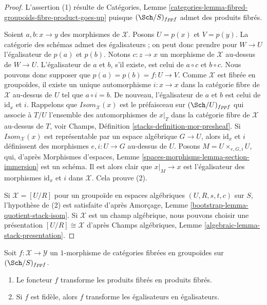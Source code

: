 \begin{proof}
L'assertion (1) résulte de
Catégories, Lemme \ref{categories-lemma-fibred-groupoids-fibre-product-goes-up}
puisque $(\Sch/S)_{fppf}$ admet des produits fibrés.

\medskip\noindent
Soient $a, b : x \to y$ des morphismes de $\mathcal{X}$.
Posons $U = p(x)$ et $V = p(y)$. La catégorie des schémas admet des égalisateurs ;
on peut donc prendre pour $W \to U$ l'égalisateur de $p(a)$ et $p(b)$.
Notons $c : z \to x$ un morphisme de $\mathcal{X}$ au-dessus de $W \to U$.
L'égalisateur de $a$ et $b$, s'il existe, est celui de $a \circ c$
et $b \circ c$. Nous pouvons donc supposer que $p(a) = p(b) = f : U \to V$.
Comme $\mathcal{X}$ est fibrée en groupoïdes, il existe un unique automorphisme
$i : x \to x$ dans la catégorie fibre de $\mathcal{X}$ au-dessus de $U$ tel que
$a \circ i = b$. De nouveau, l'égalisateur de $a$ et $b$ est celui de
$\text{id}_x$ et $i$. Rappelons que $\mathit{Isom}_\mathcal{X}(x)$
est le préfaisceau sur $(\Sch/U)_{fppf}$ qui associe à
$T/U$ l'ensemble des automorphismes de $x|_T$ dans la catégorie fibre
de $\mathcal{X}$ au-dessus de $T$, voir
Champs, Définition \ref{stacks-definition-mor-presheaf}.
Si $\mathit{Isom}_\mathcal{X}(x)$ est représentable par un espace algébrique
$G \to U$, alors $\text{id}_x$ et $i$ définissent des morphismes
$e, i : U \to G$ au-dessus de $U$. Posons $M = U \times_{e, G, i} U$, qui, d'après
Morphismes d'espaces, Lemme \ref{spaces-morphisms-lemma-section-immersion}
est un schéma. Il est alors clair que $x|_M \to x$ est l'égalisateur des
morphismes $\text{id}_x$ et $i$ dans $\mathcal{X}$.
Cela prouve (2).

\medskip\noindent
Si $\mathcal{X} = [U/R]$ pour un groupoïde en espaces algébriques
$(U, R, s, t, c)$ sur $S$, l'hypothèse de (2) est satisfaite d'après
Amorçage, Lemme \ref{bootstrap-lemma-quotient-stack-isom}.
Si $\mathcal{X}$ est un champ algébrique, nous pouvons choisir une
présentation $[U/R] \cong \mathcal{X}$ d'après
Champs algébriques, Lemme \ref{algebraic-lemma-stack-presentation}.
\end{proof}

\begin{lemma}
\label{lemma-fibre-products-morphism}
Soit $f : \mathcal{X} \to \mathcal{Y}$ un $1$-morphisme de catégories
fibrées en groupoïdes sur $(\Sch/S)_{fppf}$.
\begin{enumerate}
\item Le foncteur $f$ transforme les produits fibrés en produits fibrés.
\item Si $f$ est fidèle, alors $f$ transforme les égalisateurs en égalisateurs.
\end{enumerate}
\end{lemma}

